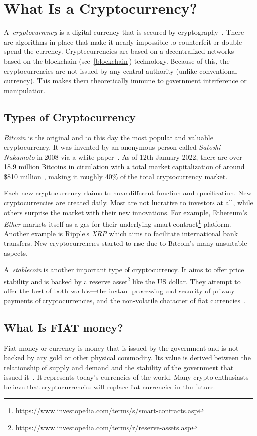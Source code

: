 \section{What Is a Cryptocurrency?}
A~\emph{cryptocurrency} is a digital currency that is secured by cryptography~\cite{investopedia-cryptocurrency}. There are algorithms in place that make it nearly impossible to counterfeit or double-spend the currency. Cryptocurrencies are based on a decentralized networks based on the blockchain (see~\ref{blockchain}) technology. Because of this, the cryptocurrencies are not issued by any central authority (unlike conventional currency). This makes them theoretically immune to government interference or manipulation.

\subsection*{Types of Cryptocurrency}
\emph{Bitcoin} is the original and to this day the most popular and valuable cryptocurrency. It was invented by an anonymous person called \emph{Satoshi Nakamoto} in 2008 via a white paper~\cite{satoshi}. As of 12th January 2022, there are over 18.9 million Bitcoins in circulation with a total market capitalization of around \$810 million~\cite{coinmarketcap}, making it roughly 40\% of the total cryptocurrency market.

Each new cryptocurrency claims to have different function and specification. New cryptocurrencies are created daily. Most are not lucrative to investors at all, while others surprise the market with their new innovations. For example, Ethereum's \emph{Ether} markets itself as a gas for their underlying smart contract\footnote{\url{https://www.investopedia.com/terms/s/smart-contracts.asp}} platform. Another example is Ripple's \emph{XRP} which aims to facilitate international bank transfers. New cryptocurrencies started to rise due to Bitcoin's many unsuitable aspects.

\label{stablecoins-ref}
A~\emph{stablecoin} is another important type of cryptocurrency. It aims to offer price stability and is backed by a reserve asset\footnote{\url{https://www.investopedia.com/terms/r/reserve-assets.asp}} like the US dollar. They attempt to offer the best of both worlds---the instant processing and security of privacy payments of cryptocurrencies, and the non-volatile character of fiat currencies~\cite{investopedia-stablecoin}.

\subsection*{What Is FIAT money?}
﻿Fiat money or currency is money that is issued by the government and is not backed by any gold or other physical commodity. Its value is derived between the relationship of supply and demand and the stability of the government that issued it~\cite{investopedia-fiat}. It represents today's currencies of the world. Many crypto enthusiasts believe that cryptocurrencies will replace fiat currencies in the future.

